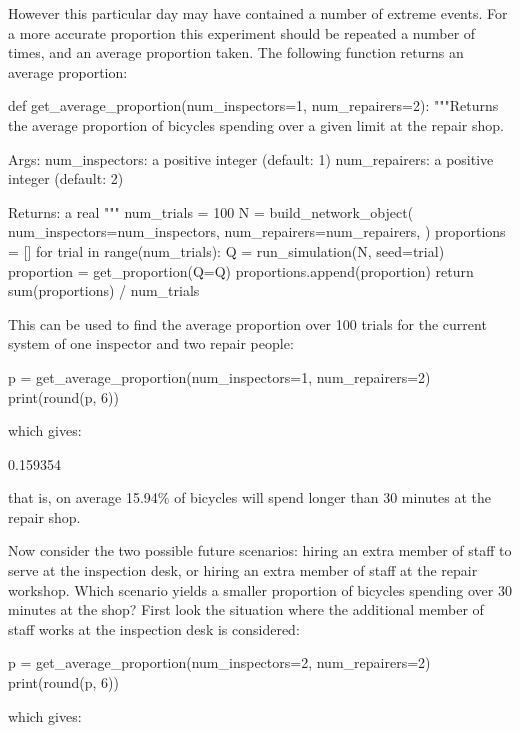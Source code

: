 However this particular day may have contained a number of extreme events.
For a more accurate proportion this experiment should be repeated a number of
times, and an average proportion taken.
The following function returns an average proportion:

\begin{pyin}
def get_average_proportion(num_inspectors=1, num_repairers=2):
    """Returns the average proportion of bicycles spending over
    a given limit at the repair shop.

    Args:
        num_inspectors: a positive integer (default: 1)
        num_repairers: a positive integer (default: 2)

    Returns:
        a real
    """
    num_trials = 100
    N = build_network_object(
        num_inspectors=num_inspectors,
        num_repairers=num_repairers,
    )
    proportions = []
    for trial in range(num_trials):
        Q = run_simulation(N, seed=trial)
        proportion = get_proportion(Q=Q)
        proportions.append(proportion)
    return sum(proportions) / num_trials
\end{pyin}

This can be used to find the average proportion over 100 trials for the current
system of one inspector and two repair people:

\begin{pyin}
p = get_average_proportion(num_inspectors=1, num_repairers=2)
print(round(p, 6))
\end{pyin}

which gives:

\begin{pyout}
0.159354
\end{pyout}

that is, on average 15.94\% of bicycles will spend longer than 30 minutes at the
repair shop.

Now consider the two possible future scenarios: hiring an
extra member of staff to serve at the inspection desk, or hiring an extra member
of staff at the repair workshop. Which scenario yields a smaller proportion of
bicycles spending over 30 minutes at the shop? First look
the situation where the additional member of staff works at the inspection desk
is considered:

\begin{pyin}
p = get_average_proportion(num_inspectors=2, num_repairers=2)
print(round(p, 6))
\end{pyin}

which gives:

